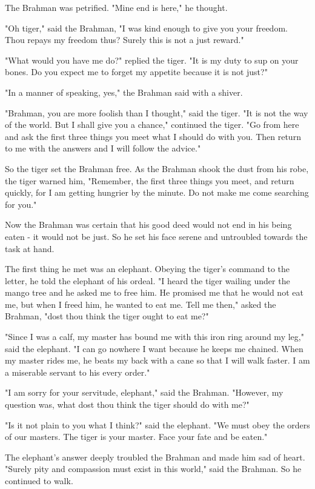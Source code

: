 The Brahman was petrified. "Mine end is here," he thought.

"Oh tiger," said the Brahman, "I was kind enough to give you your freedom. Thou repays my freedom thus? Surely this is not a just reward."

"What would you have me do?" replied the tiger. "It is my duty to sup on your bones. Do you expect me to forget my appetite because it is not just?"

"In a manner of speaking, yes," the Brahman said with a shiver.

"Brahman, you are more foolish than I thought," said the tiger. "It is not the way of the world. But I shall give you a chance," continued the tiger. "Go from here and ask the first three things you meet what I should do with you. Then return to me with the answers and I will follow the advice."

So the tiger set the Brahman free. As the Brahman shook the dust from his robe, the tiger warned him, "Remember, the first three things you meet, and return quickly, for I am getting hungrier by the minute. Do not make me come searching for you."

Now the Brahman was certain that his good deed would not end in his being eaten - it would not be just. So he set his face serene and untroubled towards the task at hand.

The first thing he met was an elephant. Obeying the tiger's command to the letter, he told the elephant of his ordeal. "I heard the tiger wailing under the mango tree and he asked me to free him. He promised me that he would not eat me, but when I freed him, he wanted to eat me. Tell me then," asked the Brahman, "dost thou think the tiger ought to eat me?"

"Since I was a calf, my master has bound me with this iron ring around my leg," said the elephant. "I can go nowhere I want because he keeps me chained. When my master rides me, he beats my back with a cane so that I will walk faster. I am a miserable servant to his every order."

"I am sorry for your servitude, elephant," said the Brahman. "However, my question was, what dost thou think the tiger should do with me?"

"Is it not plain to you what I think?" said the elephant. "We must obey the orders of our masters. The tiger is your master. Face your fate and be eaten."

The elephant's answer deeply troubled the Brahman and made him sad of heart. "Surely pity and compassion must exist in this world," said the Brahman. So he continued to walk.


